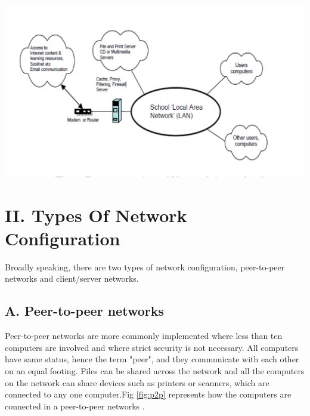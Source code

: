 \documentclass[12pt]{article}
\newenvironment{Figure}
  {\par\medskip\noindent\minipage{\linewidth}}
  {\endminipage\par\medskip}
\begin{document}
\begin{multicols*}{2}
\begin{Figure}
 \centering
 \includegraphics[width=\linewidth]{networkrepresent.png}
 \label{fig:network1}
\end{Figure}

\section*{II. Types Of Network Configuration}
\indent \indent Broadly speaking, there are two types of
network configuration, peer-to-peer networks and
client/server networks.

\subsection*{A. Peer-to-peer networks}
\indent \indent Peer-to-peer networks are more commonly
implemented where less than ten computers are
involved and where strict security is not necessary. All
computers have same status, hence the term "peer", and
they communicate with each other on an equal footing.
Files can be shared across the network and all the
computers on the network can share devices such as
printers or scanners, which are connected to any one
computer.Fig \ref{fig:p2p} represents how the computers are
connected in a peer-to-peer networks \cite{4}.


\end{multicols*}
\end{document}
